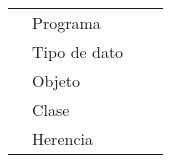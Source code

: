 \begin{table}[]
\begin{tabular}{|llll|}
                                                                               & Programa      & \multicolumn{1}{r}{}                                                                                                                                                                                        &                                                                                                                                                                                                                                                                \\
                                                                               & Tipo de dato  & \multicolumn{1}{r}{}                                                                                                                                                                                        &                                                                                                                                                                                                                                                                \\
                                                                               & Objeto        & \multicolumn{1}{r}{}                                                                                                                                                                                        &                                                                                                                                                                                                                                                                \\
                                                                               & Clase         & \multicolumn{1}{r}{}                                                                                                                                                                                        &                                                                                                                                                                                                                                                                \\
                                                                               & Herencia      &                                                                                                                                                                                                             &                                                                                                                                                                                                                                                                \\

\end{tabular}
\end{table}
